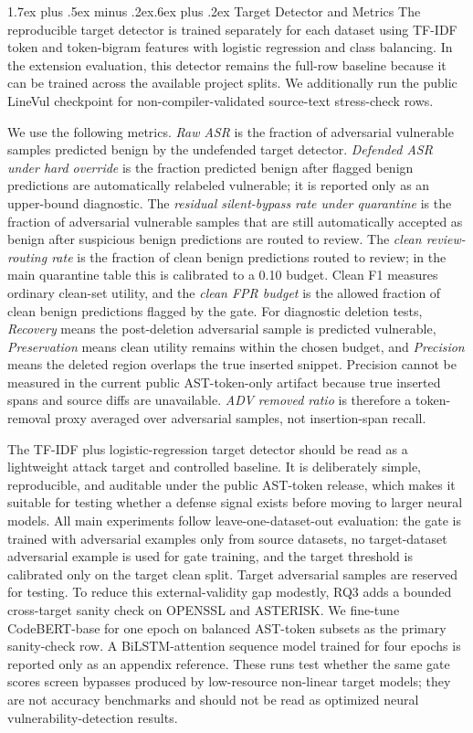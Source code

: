 \documentclass[letterpaper,twocolumn,10pt,twoside]{article}
\makeatletter
\renewcommand\subsection{\@startsection{subsection}{2}{\z@}%
  {1.7ex plus .5ex minus .2ex}{.6ex plus .2ex}%
  {\normalfont\normalsize\bfseries}}
\newcommand{\cleanf}{Clean F1}
\newcommand{\asrshort}{ASR}
\newcommand{\dataset}[1]{\textsc{#1}}
\makeatother
\begin{document}
\subsection{Target Detector and Metrics}
The reproducible target detector is trained separately for each dataset using TF-IDF token and token-bigram features with logistic regression and class balancing. In the extension evaluation, this detector remains the full-row baseline because it can be trained across the available project splits. We additionally run the public LineVul checkpoint for non-compiler-validated source-text stress-check rows.

We use the following metrics. \textit{Raw \asrshort{}} is the fraction of adversarial vulnerable samples predicted benign by the undefended target detector. \textit{Defended \asrshort{} under hard override} is the fraction predicted benign after flagged benign predictions are automatically relabeled vulnerable; it is reported only as an upper-bound diagnostic. The \textit{residual silent-bypass rate under quarantine} is the fraction of adversarial vulnerable samples that are still automatically accepted as benign after suspicious benign predictions are routed to review. The \textit{clean review-routing rate} is the fraction of clean benign predictions routed to review; in the main quarantine table this is calibrated to a 0.10 budget. \cleanf{} measures ordinary clean-set utility, and the \textit{clean FPR budget} is the allowed fraction of clean benign predictions flagged by the gate. For diagnostic deletion tests, \textit{Recovery} means the post-deletion adversarial sample is predicted vulnerable, \textit{Preservation} means clean utility remains within the chosen budget, and \textit{Precision} means the deleted region overlaps the true inserted snippet. Precision cannot be measured in the current public AST-token-only artifact because true inserted spans and source diffs are unavailable. \textit{ADV removed ratio} is therefore a token-removal proxy averaged over adversarial samples, not insertion-span recall.

The TF-IDF plus logistic-regression target detector should be read as a lightweight attack target and controlled baseline. It is deliberately simple, reproducible, and auditable under the public AST-token release, which makes it suitable for testing whether a defense signal exists before moving to larger neural models. All main experiments follow leave-one-dataset-out evaluation: the gate is trained with adversarial examples only from source datasets, no target-dataset adversarial example is used for gate training, and the target threshold is calibrated only on the target clean split. Target adversarial samples are reserved for testing. To reduce this external-validity gap modestly, RQ3 adds a bounded cross-target sanity check on \dataset{OPENSSL} and \dataset{ASTERISK}. We fine-tune CodeBERT-base for one epoch on balanced AST-token subsets as the primary sanity-check row. A BiLSTM-attention sequence model trained for four epochs is reported only as an appendix reference. These runs test whether the same gate scores screen bypasses produced by low-resource non-linear target models; they are not accuracy benchmarks and should not be read as optimized neural vulnerability-detection results.
\end{document}
